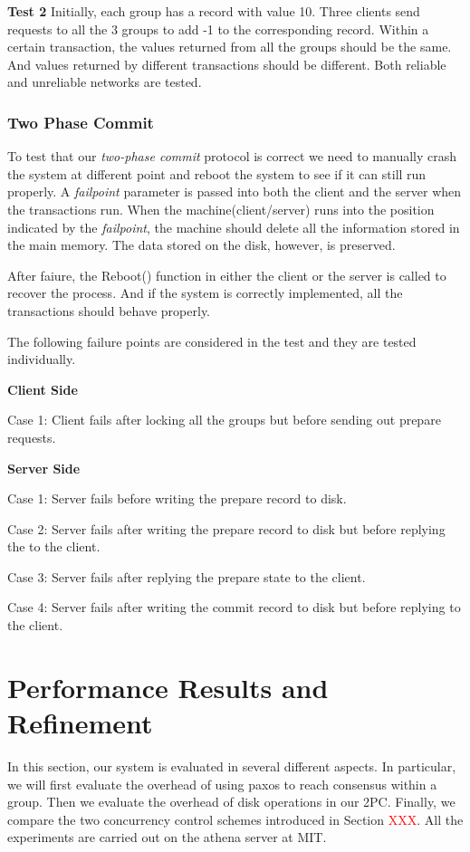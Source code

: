 \documentclass{vldb}
\begin{document}
\textbf{Test 2} Initially, each group has a record with value 10.  
Three clients send requests to all the 3 groups to add -1 to the 
corresponding record. Within a certain transaction, the values 
returned from all the groups should be the same. And values returned 
by different transactions should be different. Both reliable and 
unreliable networks are tested.

\subsubsection{Two Phase Commit}

To test that our \textit{two-phase commit} protocol is correct we need 
to manually crash the system at different point and reboot the system 
to see if it can still run properly. A \textit{failpoint} parameter is 
passed into both the client and the server when the transactions run.  
When the machine(client/server) runs into the position indicated by 
the \textit{failpoint}, the machine should delete all the information 
stored in the main memory. The data stored on the disk, however, is 
preserved.

After faiure, the Reboot() function in either the client or the server 
is called to recover the process. And if the system is correctly 
implemented, all the transactions should behave properly.

The following failure points are considered in the test and they are 
tested individually.

\textbf{Client Side}

Case 1: Client fails after locking all the groups but before sending 
out prepare requests.

\textbf{Server Side}

Case 1: Server fails before writing the prepare record to disk.

Case 2: Server fails after writing the prepare record to disk but 
before replying the to the client.

Case 3: Server fails after replying the prepare state to the client.

Case 4: Server fails after writing the commit record to disk but 
before replying to the client.


\section{Performance Results and Refinement}

In this section, our system is evaluated in several different aspects.  
In particular, we will first evaluate the overhead of using paxos to 
reach consensus within a group. Then we evaluate the overhead of disk 
operations in our 2PC. Finally, we compare the two concurrency control 
schemes introduced in Section \textcolor{red}{XXX}. All the 
experiments are carried out on the athena server at MIT. 
\end{document}
